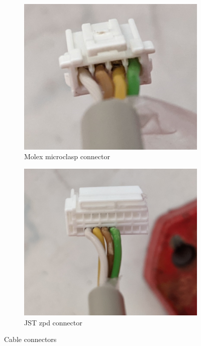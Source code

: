 \documentclass[twoside]{article}
\begin{document}
\begin{figure}[h!]
	\centering
	\begin{subfigure}[b]{0.45\textwidth}
		\includegraphics[width=\textwidth]{figs/conn_molex.jpg}
		\caption{Molex microclasp connector}
		\label{fig:molex}
	\end{subfigure}
	\begin{subfigure}[b]{0.45\textwidth}
		\includegraphics[width=\textwidth]{figs/conn_jst.jpg}
		\caption{JST zpd connector}
		\label{fig:jst}
	\end{subfigure}
	\caption{Cable connectors}
	\label{fig:JpgEpsCompare}
\end{figure}
\end{document}
